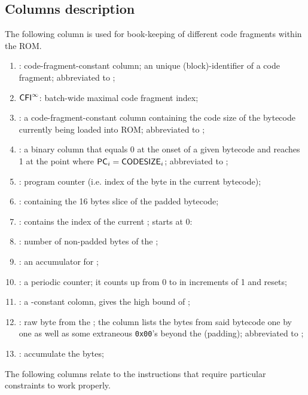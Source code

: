 \subsection{Columns description}

The following column is used for book-keeping of different code fragments within the ROM.
\begin{enumerate}
    \item \CFI{}: code-fragment-constant column; an unique (block)-identifier of a code fragment; abbreviated to \cfi{};
    \item $\textsf{CFI}^\infty$: batch-wide maximal code fragment index;
    \item \CS{}: a code-fragment-constant column containing the code size of the bytecode currently being loaded into ROM; abbreviated to \cs{};
    \item \CSR{}: a binary column that equals 0 at the onset of a given bytecode and reaches 1 at the point where $\textsf{PC}_i=\textsf{CODESIZE}_i$; abbreviated to \csr{};
    \item \pc{}: program counter (i.e. index of the byte in the current bytecode);
    \item \limb{}: containing the 16 bytes slice of the padded bytecode;
    \item \index{}: contains the index of the current \limb{}; starts at 0:
    \item \nBytes{}: number of non-padded bytes of the \limb;
    \item \nBytesAcc{}: an accumulator for \nBytes{};
    \item \ct{}: a periodic counter; it counts up from 0 to \ctMax{} in increments of 1 and resets;
    \item \ctMax{}: a \ct{}-constant colomn, gives the high bound of \ct{};
    \item \PBCB{}: raw byte from the \limb{}; the \pbcb{} column lists the bytes from said bytecode one by one as well as some extraneous \texttt{0x00}'s beyond the \CS{} (padding); abbreviated to \pbcb{};
    \item \ACC{}: accumulate the \pbcb{} bytes;
\end{enumerate}
The following columns relate to the  instructions that require particular constraints to work properly.

